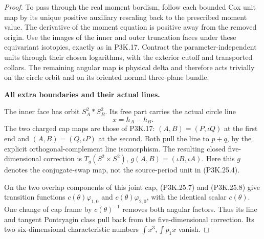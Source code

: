 \begin{proof}
To pass through the real moment bordism, follow each bounded
Cox unit map by its unique positive auxiliary rescaling back
to the prescribed moment value. The derivative of the moment
equation is positive away from the removed origin. Use the
images of the inner and outer truncation faces under these
equivariant isotopies, exactly as in P3K.17. Contract the
parameter-independent units through their chosen logarithms,
with the exterior cutoff and transported collars. The
remaining angular map is physical delta and therefore acts
trivially on the circle orbit and on its oriented normal
three-plane bundle.

\par\medskip\noindent\textbf{All extra boundaries and their actual lines.}\enspace

The inner face has orbit \(S^2_A*S^2_B\). Its free part carries
the actual circle line
\[
                       x=h_A-h_B.
                                                        \tag{P3K.25.9}
\]
The two charged cap maps are those of P3K.17:
\((A,B)=(P,\iota Q)\) at the first end and
\((A,B)=(Q,\iota P)\) at the second. Both pull the line to
\(p+q\), by the explicit orthogonal-complement line
isomorphism. The resulting closed five-dimensional correction
is \(T_g(S^2\times S^2)\), \(g(A,B)=(\iota B,\iota A)\).
Here this \(g\) denotes the conjugate-swap map, not the
source-period unit in (P3K.25.4).

On the two overlap components of this joint cap, (P3K.25.7)
and (P3K.25.8) give transition functions
\(c(\theta)\varphi_{1,0}\) and
\(c(\theta)\varphi_{2,0}\), with the identical scalar
\(c(\theta)\). One change of cap frame by \(c(\theta)^{-1}\)
removes both angular factors. Thus its line and tangent
Pontryagin class pull back from the five-dimensional
correction. Its two six-dimensional characteristic numbers
\(\int x^3,\int p_1x\) vanish.


\end{proof}
